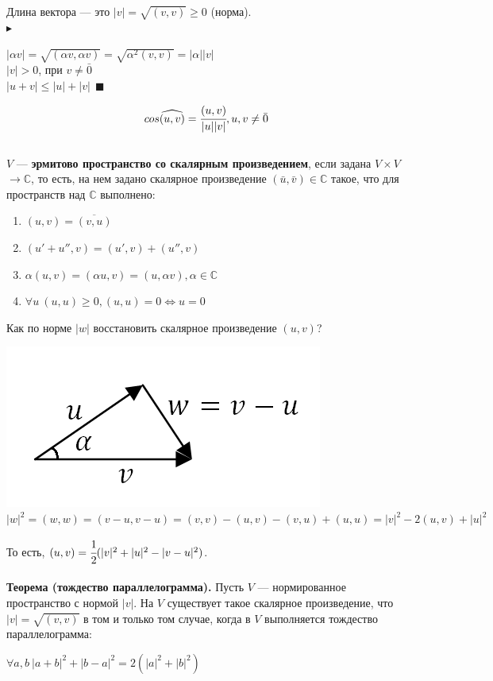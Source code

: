 \documentclass[12pt]{article}
\theoremstyle{definition}
\numberwithin{equation}{section}
\begin{document}
	Длина вектора --- это $|v| = \sqrt{(v, v)} \geqslant 0$ (норма).\\
	$\blacktriangleright$ \begin{center}$|\alpha v| = \sqrt{(\alpha v, \alpha v)} = \sqrt{\alpha^2 (v, v)} = |\alpha||v|$\\
		$|v| > 0$, при $v \neq \bar 0$\\
		$|u+v| \leqslant |u|+|v| ~~\blacksquare$\end{center}
	$$cos \widehat{(u, v)} = \cfrac{(u, v)}{|u||v|}, u, v \neq \bar 0$$\\
	$V$ --- \textbf{эрмитово пространство со скалярным произведением}, если задана $V \times V$ $\rightarrow \mathbb{C}$, то есть, на нем задано скалярное произведение $(\bar u, \bar v) \in \mathbb{C}$ такое, что для пространств над $\mathbb{C}$ выполнено:\begin{enumerate}
		\item $(u, v) = \overline{(v, u)}$
		\item $(u'+u'', v) = (u', v)+(u'', v)$
		\item $\alpha (u, v) = (\alpha u, v) = (u, \alpha v), \alpha \in \mathbb{C}$
		\item $\forall u~ (u, u) \geqslant 0, (u, u) = 0 \Leftrightarrow u=0$
	\end{enumerate}
	Как по норме $|w|$ восстановить скалярное произведение $(u, v)$?
	\begin{center}\includegraphics[scale=0.55]{l5_10.png}\\
		$|w|^2 = (w, w) = (v-u, v-u) = (v, v) - (u, v) - (v, u) + (u, u) = |v|^2 - 2(u, v) + |u|^2$\end{center}
	То есть, $(u, v) = \cfrac{1}{2}(|v|^2 + |u|^2 - |v-u|^2)$.\\
	\\
	\textbf{Теорема (тождество параллелограмма).}
	Пусть $V$ --- нормированное пространство с нормой $|v|$. На $V$ существует такое скалярное произведение, что $|v| = \sqrt{(v, v)}$ в том и только том случае, когда в $V$ выполняется тождество параллелограмма:\begin{center}
		$\forall a, b~ |a+b|^2 + |b-a|^2 = 2(|a|^2 + |b|^2)$\end{center}
\end{document}
